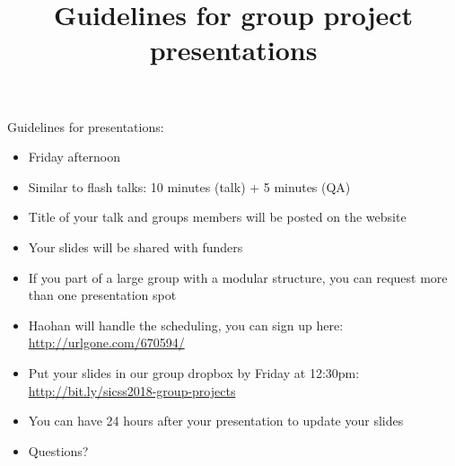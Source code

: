 \documentclass[aspectratio=169]{beamer}
\title[]{Guidelines for group project presentations}
\author[]{}
\date[]{Summer Institute in Computational Social Science\\June 28, 2018
\vfill
\begin{flushleft}
{\scriptsize
The Summer Institute in Computational Social Science is supported by grants from the Russell Sage Foundation and the Alfred P. Sloan Foundation.}
\end{flushleft}
\begin{flushright}
\texttt{[image: figures/cc-by.png]}
\end{flushright}
}
\begin{document}
\frame{\titlepage}
\begin{frame}

Guidelines for presentations:
\begin{itemize}
\item Friday afternoon \pause
\item Similar to flash talks: 10 minutes (talk) + 5 minutes (QA) \pause
\item Title of your talk and groups members will be posted on the website \pause
\item Your slides will be shared with funders \pause
\item If you part of a large group with a modular structure, you can request more than one presentation spot \pause
\item Haohan will handle the scheduling, you can sign up here: \textcolor{blue}{\url{http://urlgone.com/670594/}} \pause
\item Put your slides in our group dropbox by Friday at 12:30pm: \textcolor{blue}{\url{http://bit.ly/sicss2018-group-projects}} \pause
\item You can have 24 hours after your presentation to update your slides \pause
\item Questions?
\end{itemize}

\end{frame}
\end{document}
